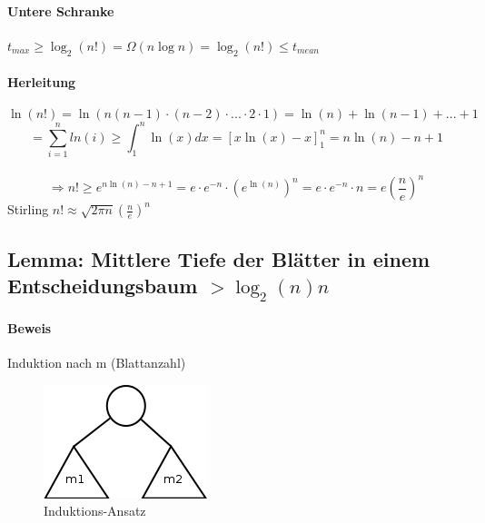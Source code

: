 \paragraph{Untere Schranke}
$t_{max} \geq \log_2(n!) = \Omega(n \log n) =  \log_2(n!) \leq t_{mean}$
\vspace{90pt}


\paragraph{Herleitung}
\[ \ln(n!) = \ln(n(n-1) \cdot (n-2) \cdot ... \cdot 2 \cdot 1) = \ln(n)+\ln(n-1)+...+1\]
\[ = \sum^{n}_{i=1} ln(i) \geq \int_1^n \ln(x) dx = \left[x\ln(x)-x \right]_1^{n} = n\ln(n)-n+1\]\\
\[\Rightarrow n! \geq e^{n\ln(n)-n+1} = e \cdot e^{-n} \cdot \left(e^{\ln(n)}\right)^n = e \cdot e^{-n} \cdot n = e\left(\frac{n}{e}\right)^n \] 
Stirling $n! \approx \sqrt{2 \pi n} (\frac{n}{e})^n$


\subsection{Lemma: Mittlere Tiefe der Blätter in einem Entscheidungsbaum $> \log_2(n)n$}

\paragraph{Beweis} Induktion nach m (Blattanzahl)

\begin{figure}
\vspace{-50pt}
\includegraphics[width=\linewidth]{09/Grafik/img2.png}
\caption{Induktions-Ansatz}
\end{figure}

